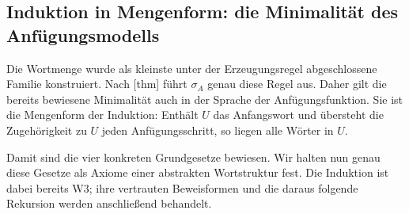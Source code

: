 \subsection{Induktion in Mengenform: die Minimalität des Anfügungsmodells}

Die Wortmenge wurde als kleinste unter der Erzeugungsregel abgeschlossene
Familie konstruiert. Nach
[thm] führt
\(\sigma_A\) genau diese Regel aus. Daher gilt die bereits bewiesene
Minimalität auch in der Sprache der Anfügungsfunktion. Sie ist die
Mengenform der Induktion: Enthält \(U\) das Anfangswort und übersteht
die Zugehörigkeit zu \(U\) jeden Anfügungsschritt, so liegen alle
Wörter in \(U\).

\noindent\begin{minipage}{\linewidth}
\end{minipage}\par
\begin{tabproofwide}
\end{tabproofwide}

Damit sind die vier konkreten Grundgesetze bewiesen. Wir halten nun
genau diese Gesetze als Axiome einer abstrakten Wortstruktur fest.
Die Induktion ist dabei bereits W3; ihre vertrauten Beweisformen
und die daraus folgende Rekursion werden anschließend behandelt.
